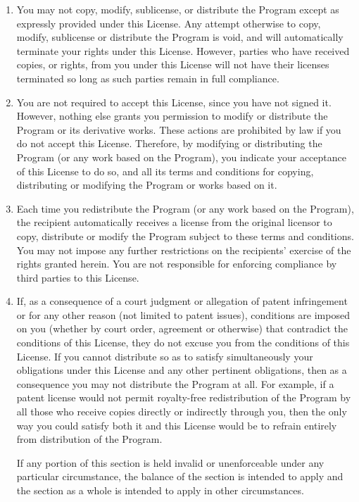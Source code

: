 \documentclass[a4paper,11pt,oneside]{book}
\begin{document}
\begin{enumerate}
	\item
	You may not copy, modify, sublicense, or distribute the Program
	except as expressly provided under this License.  Any attempt
	otherwise to copy, modify, sublicense or distribute the Program is
	void, and will automatically terminate your rights under this License.
	However, parties who have received copies, or rights, from you under
	this License will not have their licenses terminated so long as such
	parties remain in full compliance.

	\item
	You are not required to accept this License, since you have not
	signed it.  However, nothing else grants you permission to modify or
	distribute the Program or its derivative works.  These actions are
	prohibited by law if you do not accept this License.  Therefore, by
	modifying or distributing the Program (or any work based on the
	Program), you indicate your acceptance of this License to do so, and
	all its terms and conditions for copying, distributing or modifying
	the Program or works based on it.

	\item
	Each time you redistribute the Program (or any work based on the
	Program), the recipient automatically receives a license from the
	original licensor to copy, distribute or modify the Program subject to
	these terms and conditions.  You may not impose any further
	restrictions on the recipients' exercise of the rights granted herein.
	You are not responsible for enforcing compliance by third parties to
	this License.

	\item
	If, as a consequence of a court judgment or allegation of patent
	infringement or for any other reason (not limited to patent issues),
	conditions are imposed on you (whether by court order, agreement or
	otherwise) that contradict the conditions of this License, they do not
	excuse you from the conditions of this License.  If you cannot
	distribute so as to satisfy simultaneously your obligations under this
	License and any other pertinent obligations, then as a consequence you
	may not distribute the Program at all.  For example, if a patent
	license would not permit royalty-free redistribution of the Program by
	all those who receive copies directly or indirectly through you, then
	the only way you could satisfy both it and this License would be to
	refrain entirely from distribution of the Program.

	If any portion of this section is held invalid or unenforceable under
	any particular circumstance, the balance of the section is intended to
	apply and the section as a whole is intended to apply in other
	circumstances.


\end{enumerate}
\end{document}
